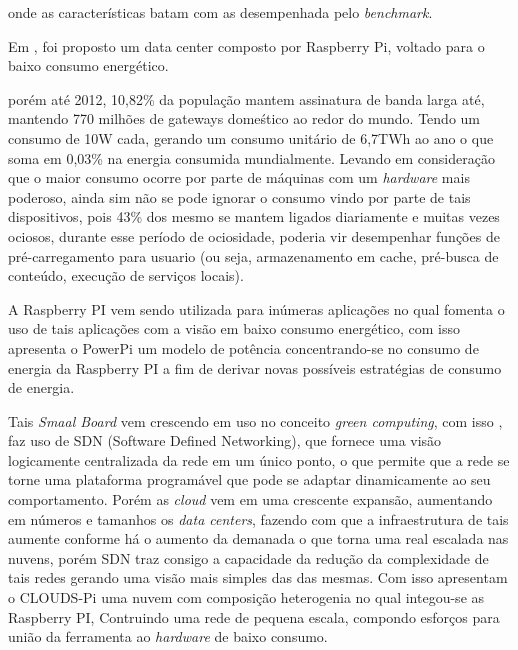 \documentclass[12pt]{article}
\begin{document}
    
    onde as características batam com as desempenhada pelo \textit{benchmark}.

  Em \cite{PiConsumo}, foi proposto um data center composto por Raspberry Pi, %
  voltado para o baixo consumo energético.
  
  
  
  porém até 2012, %
  10,82\% da população mantem assinatura de banda larga até, mantendo 770 milhões de gateways domeśtico ao redor do mundo. Tendo um consumo de 10W cada, %
  gerando um consumo unitário de 6,7TWh ao ano o que soma em 0,03\% na energia consumida mundialmente.
  Levando em consideração que o maior consumo ocorre por parte de máquinas com um \textit{hardware} mais poderoso, ainda sim não se pode ignorar o consumo vindo por parte de tais dispositivos, pois 43\% dos mesmo se mantem ligados diariamente e muitas vezes ociosos, durante esse período de ociosidade, poderia vir desempenhar funções de pré-carregamento para usuario (ou seja, armazenamento em cache, pré-busca de conteúdo, execução de serviços locais).

  A Raspberry PI vem sendo utilizada para inúmeras aplicações no qual fomenta o uso de tais aplicações com a visão em baixo consumo energético, com isso \cite{PiConsumo} apresenta o PowerPi um modelo de  potência concentrando-se no consumo de energia da Raspberry PI a fim de derivar novas possíveis estratégias de consumo de energia.


  Tais \textit{Smaal Board} vem crescendo em uso no conceito \textit{green computing}, com isso \cite{2018CLOUDSPiA}, faz uso de SDN (Software Defined Networking), que fornece uma visão logicamente centralizada da rede em um único ponto, o que permite que a rede se torne uma plataforma programável que pode se adaptar dinamicamente ao seu comportamento. Porém as \textit{cloud} vem em uma crescente expansão, aumentando em números e tamanhos os \textit{data centers}, fazendo com que a infraestrutura de tais aumente conforme há o aumento da demanada o que torna uma real escalada nas nuvens, porém SDN traz consigo a capacidade da redução da complexidade de tais redes gerando uma visão mais simples das das mesmas. Com isso apresentam o CLOUDS-Pi uma nuvem com composição heterogenia no qual integou-se as Raspberry PI, Contruindo uma rede de pequena escala, compondo esforços para união da ferramenta ao \textit{hardware} de baixo consumo.    
  
\end{document}
